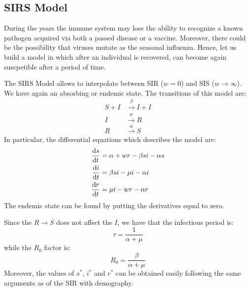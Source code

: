 \documentclass[../main/main.tex]{subfiles}
\begin{document}


\subsection{SIRS Model}
During the years the immune system may lose the ability to recognize a known pathogen acquired via both a passed disease or a vaccine. Moreover, there could be the possibility that viruses mutate as the seasonal influenza. Hence, let us build a model in which after an individual is recovered, can become again suscpetible after a period of time.

The SIRS Model allows to interpolate between SIR (\( w=0 \)) and SIS (\( w \rightarrow \infty  \)). We have again an absorbing or endemic state.
The transitions of this model are:
\begin{equation}
\begin{split}
 S + I &\overset{\beta }{\rightarrow } I + I   \\
 I & \overset{\mu }{\rightarrow } R  \\
 R & \overset{w}{\rightarrow } S
\end{split}
\end{equation}
In particular, the differential equations which describes the model are:
\begin{equation}
  \begin{split}
    \dv{s}{t} &= \alpha + w r - \beta  s i - \alpha s \\
  \dv{i}{t} &= \beta s i - \mu i - \alpha i \\
  \dv{r}{t} &= \mu i - w r - \alpha r
\end{split}
\end{equation}
The endemic state can be found by putting the derivatives equal to zero.

Since the \( R \rightarrow S \) does not affect the \( I \), we have that the infectious period is:
\begin{equation}
  \tau = \frac{1}{\alpha + \mu }
\end{equation}
while the \( R_0 \) factor is:
\begin{equation}
  R_0 = \frac{\beta }{\alpha + \mu }
\end{equation}
Moreover, the values of \( s^* \), \( i^* \) and \( r^* \) can be obtained easily following the same arguments as of the SIR with demography.
\end{document}
